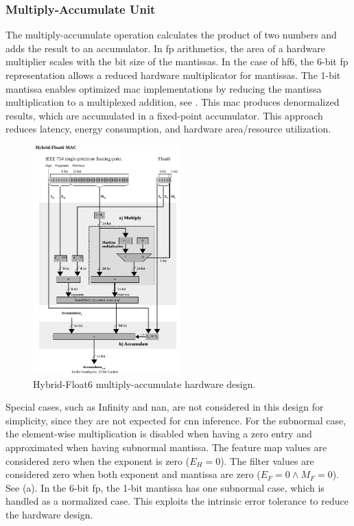 \subsubsection{Multiply-Accumulate Unit}
The multiply-accumulate operation calculates the product of two numbers and adds the result to an accumulator. In \gls{fp} arithmetics, the area of a hardware multiplier scales with the bit size of the mantissas. In the case of \gls{hf6}, the 6-bit \gls{fp} representation allows a reduced hardware multiplicator for mantissas. The 1-bit mantissa enables optimized \gls{mac} implementations by reducing the mantissa multiplication to a multiplexed addition, see . This \gls{mac} produces denormalized results, which are accumulated in a fixed-point accumulator. This approach reduces latency, energy consumption, and hardware area/resource utilization.

\begin{figure}[t!]
	\centering
	\includegraphics[width=0.5\textwidth]{./chapters/cnn_accelerator/figures/multiplier.pdf}
	\caption{Hybrid-Float6 multiply-accumulate hardware design.}
	\label{fig:multiplier}
\end{figure}

Special cases, such as Infinity and \gls{nan}, are not considered in this design for simplicity, since they are not expected for \gls{cnn} inference. For the subnormal case, the element-wise multiplication is disabled when having a zero entry and approximated when having subnormal mantissa. The feature map values are considered zero when the exponent is zero ($E_H=0$). The filter values are considered zero when both exponent and mantissa are zero ($E_F=0\land M_F=0$). See (a). In the 6-bit \gls{fp}, the 1-bit mantissa has one subnormal case, which is handled as a normalized case. This exploits the intrinsic error tolerance to reduce the hardware design.

